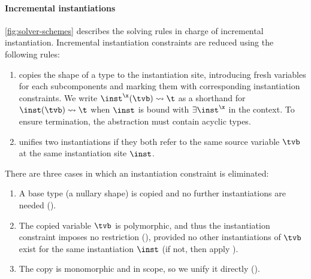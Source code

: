 \documentclass[acmsmall,screen,nonacm%
\Anonymous{,anonymous}{}%
\Final{}{,review}%
]{acmart}
\begin{document}
\begin{mathparfig}[tp]
\rewrite[S-Compress]
  {\cletr \x \tv {\tvs, \tvb} {\ca \cand \cunif \tvb {\cunif \tvc \ueq}} {\cb}}
  {\tvb \neq \tvc}
  {\cletr \x \tv {\tvs}
     {\ca\where{\tvb \is \tvc}
      \cand \cunif \tvc {\ueq\where{\tvb \is \tvc}}}
     {\cb\where{\x(\tvb) \is \tvc}}}

  {\th \cdetermines {\cexists {\tv, \tvas} \ca} \tvbs}
  {\cexists \tvbs \cletr \x \tv \tvas \ca \cb}

  {\th \cdetermines {\cexists \tvbs \c \cand \cunif \tvc \ueq} \tvs}

  {\th \cdetermines {\cexists \tvbs \c \cand \cunif \tvs {\cunif \t \ueq}} \tvs}
\end{mathparfig}

\paragraph{Incremental instantiations}

\cref{fig:solver-schemes} describes the solving rules in charge of incremental
instantiation.
%
Incremental instantiation constraints are reduced using the following rules:
\begin{enumerate}

\item
     copies the shape of a type to the
    instantiation site, 
    introducing fresh variables for each subcomponents and marking them with
    corresponding instantiation constraints.
    We write $\cpapp \x \tvb \t \inst$ as a shorthand for $\cpinst \inst \tvb \t$
    when $\inst$ is bound with $\exists \inst^\x$ in the context. To ensure
    termination, the abstraction must contain acyclic types.

  \item
     unifies two instantiations if they both
    refer to the same source variable $\tvb$ at the same instantiation site
    $\inst$. 
    
\end{enumerate}
There are three cases in which an instantiation constraint is eliminated:
\begin{enumerate}
  \item
   \sloppy
    A base type (\ie a nullary shape) is copied and no further
    instantiations are needed ().
    
  \item
    The copied variable $\tvb$ is polymorphic, and thus the instantiation
    constraint imposes no restriction (), provided no
    other instantiations of $\tvb$ exist for the same instantiation $\inst$ (if
    not, then apply ).

  \item
    The copy is monomorphic and in scope, so we unify it directly
    ().
\end{enumerate}
\end{document}
